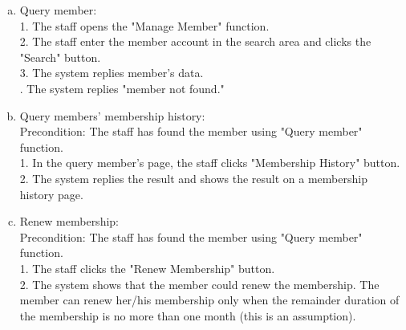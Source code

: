 \documentclass[11pt]{article}
\begin{document}
\begin{enumerate}[(a)]
\item Query member:\\
1. The staff opens the "Manage Member" function.\\
2. The staff enter the member account in the search area and clicks the "Search" button.\\
3. The system replies member's data.\\
. The system replies "member not found."
\item Query members' membership history:\\
Precondition: The staff has found the member using "Query member" function.\\
1. In the query member's page, the staff clicks "Membership History" button.\\
2. The system replies the result and shows the result on a membership history page.
\item Renew membership:\\
Precondition: The staff has found the member using "Query member" function.\\
1. The staff clicks the "Renew Membership" button.\\
2. The system shows that the member could renew the membership. The member can renew her/his membership only when the remainder duration of the membership is no more than one month (this is an assumption).\\

\end{enumerate}
\end{document}
